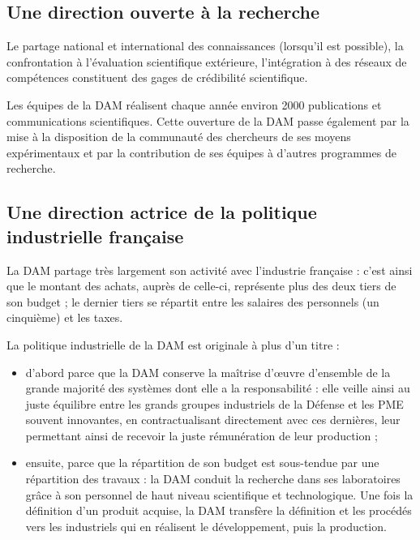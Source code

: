 \documentclass[12pt,a4paper,twoside]{article}
\begin{document}
    \subsection*{Une direction ouverte à la recherche}
    Le partage national et international des connaissances (lorsqu'il est possible),
    la confrontation à l'évaluation scientifique extérieure, l'intégration à des
    réseaux de compétences constituent des gages de crédibilité scientifique.

    Les équipes de la DAM réalisent chaque année environ 2000 publications et
    communications scientifiques. Cette ouverture de la DAM passe également par la
    mise à la disposition de la communauté des chercheurs de ses moyens
    expérimentaux et par la contribution de ses équipes à d'autres programmes de
    recherche.

    \subsection*{Une direction actrice de la politique industrielle française}
    La DAM partage très largement son activité avec l'industrie française : c'est
    ainsi que le montant des achats, auprès de celle-ci, représente plus des deux
    tiers de son budget ; le dernier tiers se répartit entre les salaires des
    personnels (un cinquième) et les taxes.

    La politique industrielle de la DAM est originale à plus d'un titre :

    \begin{itemize}[label=\textbullet]
        \item
        d'abord parce que la DAM conserve la maîtrise d'\oe uvre
        d'ensemble de la grande majorité des systèmes dont elle a la
        responsabilité : elle veille ainsi au juste équilibre entre les
        grands groupes industriels de la Défense et les PME souvent
        innovantes, en contractualisant directement avec ces dernières,
        leur permettant ainsi de recevoir la juste rémunération de leur
        production ;
        \item
        ensuite, parce que la répartition de son budget est sous-tendue
        par une répartition des travaux : la DAM conduit la recherche
        dans ses laboratoires grâce à son personnel de haut niveau
        scientifique et technologique. Une fois la définition d'un
        produit acquise, la DAM transfère la définition et les procédés
        vers les industriels qui en réalisent le développement, puis la
        production.
    \end{itemize}
\end{document}
